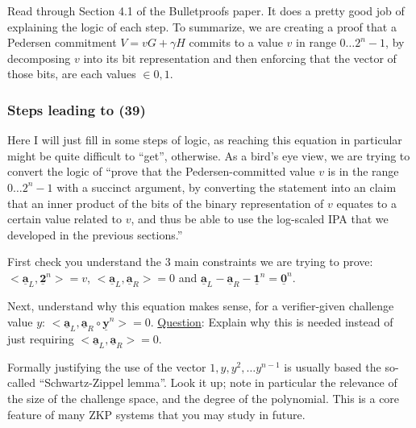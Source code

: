\documentclass[10pt,a4paper]{article}
\begin{document}
\vspace{5 pt}

Read through Section 4.1 of the Bulletproofs paper. It does a pretty good job of explaining the logic of each step. To summarize, we are creating a proof that a Pedersen commitment $V = vG + \gamma H$ commits to a value $v$ in range $0 \ldots 2^{n}-1$, by decomposing $v$ into its bit representation and then enforcing that the vector of those bits, are each values $\in {0,1}$.

\subsubsection{Steps leading to (39)}

Here I will just fill in some steps of logic, as reaching this equation in particular might be quite difficult to ``get'', otherwise. As a bird's eye view, we are trying to convert the logic of ``prove that the Pedersen-committed value $v$ is in the range $ 0 \ldots 2^{n} -1$ with a succinct argument, by converting the statement into an claim that an inner product of the bits of the binary representation of $v$ equates to a certain value related to $v$, and thus be able to use the log-scaled IPA that we developed in the previous sections.''

\vspace{5 pt}

First check you understand the 3 main constraints we are trying to prove: $<\underline{\textbf{a}}_L, \underline{\textbf{2}}^n> = v$, $<\underline{\textbf{a}}_L,\underline{\textbf{a}}_R> = 0$ and $\underline{\textbf{a}}_L - \underline{\textbf{a}}_R - \underline{\textbf{1}}^n = \underline{\textbf{0}}^n$.

\vspace{5 pt}

Next, understand why this equation makes sense, for a verifier-given challenge value $y$: $<\underline{\textbf{a}}_L, \underline{\textbf{a}}_R \circ \underline{\textbf{y}}^n> = 0$. \underline{Question}: Explain why this is needed instead of just requiring $<\underline{\textbf{a}}_L,\underline{\textbf{a}}_R> = 0$.

\vspace{5 pt}

Formally justifying the use of the vector $1, y, y^2, \ldots y^{n-1}$ is usually based the so-called ``Schwartz-Zippel lemma''. Look it up; note in particular the relevance of the size of the challenge space, and the degree of the polynomial. This is a core feature of many ZKP systems that you may study in future.
\end{document}
